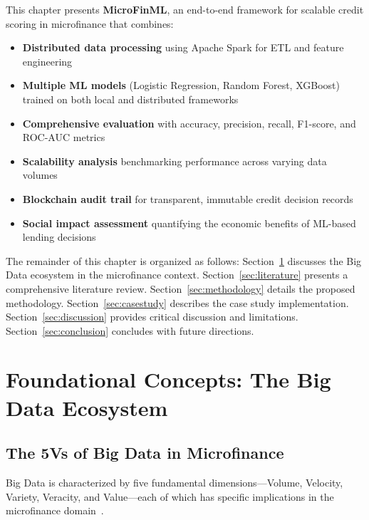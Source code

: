 \documentclass[preprint,12pt,authoryear]{elsarticle}
\begin{document}
This chapter presents \textbf{MicroFinML}, an end-to-end framework for scalable credit scoring in microfinance that combines:
\begin{itemize}
    \item \textbf{Distributed data processing} using Apache Spark for ETL and feature engineering
    \item \textbf{Multiple ML models} (Logistic Regression, Random Forest, XGBoost) trained on both local and distributed frameworks
    \item \textbf{Comprehensive evaluation} with accuracy, precision, recall, F1-score, and ROC-AUC metrics
    \item \textbf{Scalability analysis} benchmarking performance across varying data volumes
    \item \textbf{Blockchain audit trail} for transparent, immutable credit decision records
    \item \textbf{Social impact assessment} quantifying the economic benefits of ML-based lending decisions
\end{itemize}

The remainder of this chapter is organized as follows: Section~\ref{sec:bigdata} discusses the Big Data ecosystem in the microfinance context. Section~\ref{sec:literature} presents a comprehensive literature review. Section~\ref{sec:methodology} details the proposed methodology. Section~\ref{sec:casestudy} describes the case study implementation. Section~\ref{sec:discussion} provides critical discussion and limitations. Section~\ref{sec:conclusion} concludes with future directions.



\section{Foundational Concepts: The Big Data Ecosystem}
\label{sec:bigdata}

\subsection{The 5Vs of Big Data in Microfinance}

Big Data is characterized by five fundamental dimensions---Volume, Velocity, Variety, Veracity, and Value---each of which has specific implications in the microfinance domain~\cite{chen2014bigdata, sivarajah2017bigdata}.
\end{document}
